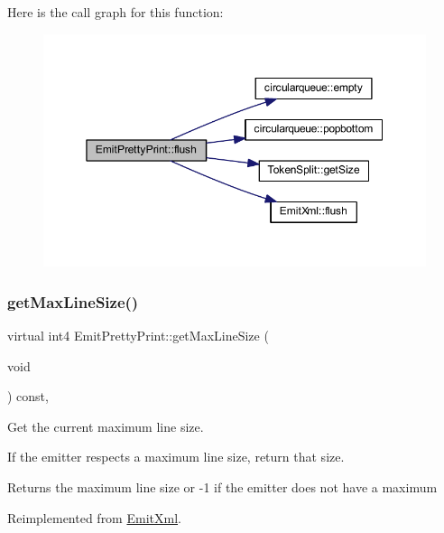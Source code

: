 Here is the call graph for this function\+:
\nopagebreak
\begin{figure}[H]
\begin{center}
\leavevmode
\includegraphics[width=350pt]{class_emit_pretty_print_a4537a56174d63dfc806c8b599181723b_cgraph}
\end{center}
\end{figure}
\mbox{\label{class_emit_pretty_print_a32cde009472958f2b1350ed8461c979e}} 
\subsubsection{\texorpdfstring{getMaxLineSize()}{getMaxLineSize()}}
{\footnotesize\ttfamily virtual int4 Emit\+Pretty\+Print\+::get\+Max\+Line\+Size (\begin{DoxyParamCaption}\item[{void}]{ }\end{DoxyParamCaption}) const\hspace{0.3cm}{\ttfamily [inline]}, {\ttfamily [virtual]}}



Get the current maximum line size. 

If the emitter respects a maximum line size, return that size. \begin{DoxyReturn}{Returns}
the maximum line size or -\/1 if the emitter does not have a maximum 
\end{DoxyReturn}


Reimplemented from \mbox{\hyperlink{class_emit_xml_a3867bff6084118990799e3d9a2c1eb00}{Emit\+Xml}}.



